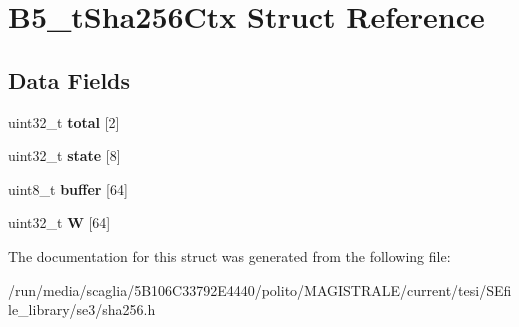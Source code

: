 \hypertarget{struct_b5__t_sha256_ctx}{\section{B5\-\_\-t\-Sha256\-Ctx Struct Reference}
\label{struct_b5__t_sha256_ctx}
}
\subsection*{Data Fields}
\begin{DoxyCompactItemize}
\item 
\hypertarget{struct_b5__t_sha256_ctx_a8c253fc902f73d2c19d4ce29a50f4761}{uint32\-\_\-t {\bfseries total} \mbox{[}2\mbox{]}}\label{struct_b5__t_sha256_ctx_a8c253fc902f73d2c19d4ce29a50f4761}

\item 
\hypertarget{struct_b5__t_sha256_ctx_a7b8950bc92d4e3983d1c71711dacaa43}{uint32\-\_\-t {\bfseries state} \mbox{[}8\mbox{]}}\label{struct_b5__t_sha256_ctx_a7b8950bc92d4e3983d1c71711dacaa43}

\item 
\hypertarget{struct_b5__t_sha256_ctx_a222be7951fa5eae2df611ed742ca64d2}{uint8\-\_\-t {\bfseries buffer} \mbox{[}64\mbox{]}}\label{struct_b5__t_sha256_ctx_a222be7951fa5eae2df611ed742ca64d2}

\item 
\hypertarget{struct_b5__t_sha256_ctx_ad555e10fd58ea7df2d2cdce3e59ebc53}{uint32\-\_\-t {\bfseries W} \mbox{[}64\mbox{]}}\label{struct_b5__t_sha256_ctx_ad555e10fd58ea7df2d2cdce3e59ebc53}

\end{DoxyCompactItemize}


The documentation for this struct was generated from the following file\-:\begin{DoxyCompactItemize}
\item 
/run/media/scaglia/5\-B106\-C33792\-E4440/polito/\-M\-A\-G\-I\-S\-T\-R\-A\-L\-E/current/tesi/\-S\-Efile\-\_\-library/se3/sha256.\-h\end{DoxyCompactItemize}

